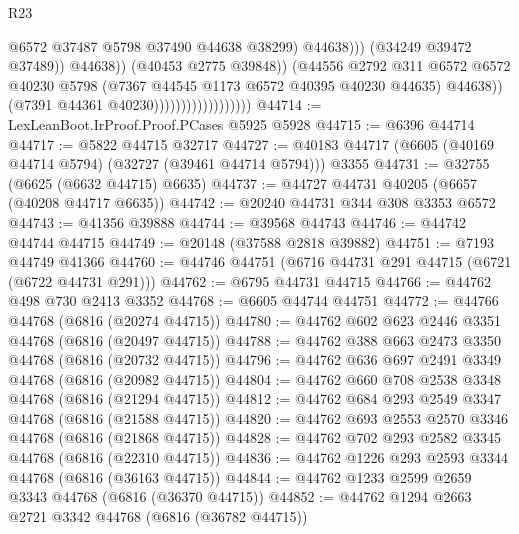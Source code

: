 \begin{lexlean}{R23}
\begin{coremodule}
                                                        @6572
                                                        @37487
                                                        @5798
                                                        @37490
                                                        @44638
                                                        @38299)
                                                      @44638)))
                                                (@34249 @39472 @37489))
                                              @44638))
                                          (@40453 @2775 @39848))
                                        (@44556
                                          @2792
                                          @311
                                          @6572
                                          @6572
                                          @40230
                                          @5798
                                          (@7367 @44545 @1173 @6572 @40395 @40230 @44635)
                                          @44638))
                                      (@7391 @44361 @40230))))))))))))))))))
@44714 := LexLeanBoot.IrProof.Proof.PCases @5925 @5928
@44715 := @6396 @44714
@44717 := @5822 @44715 @32717
@44727 := @40183 @44717 (@6605 (@40169 @44714 @5794) (@32727 (@39461 @44714 @5794))) @3355
@44731 := @32755 (@6625 (@6632 @44715) @6635)
@44737 := @44727 @44731 @40205 (@6657 (@40208 @44717 @6635))
@44742 := @20240 @44731 @344 @308 @3353 @6572
@44743 := @41356 @39888
@44744 := @39568 @44743
@44746 := @44742 @44744 @44715
@44749 := @20148 (@37588 @2818 @39882)
@44751 := @7193 @44749 @41366
@44760 := @44746 @44751 (@6716 @44731 @291 @44715 (@6721 (@6722 @44731 @291)))
@44762 := @6795 @44731 @44715
@44766 := @44762 @498 @730 @2413 @3352
@44768 := @6605 @44744 @44751
@44772 := @44766 @44768 (@6816 (@20274 @44715))
@44780 := @44762 @602 @623 @2446 @3351 @44768 (@6816 (@20497 @44715))
@44788 := @44762 @388 @663 @2473 @3350 @44768 (@6816 (@20732 @44715))
@44796 := @44762 @636 @697 @2491 @3349 @44768 (@6816 (@20982 @44715))
@44804 := @44762 @660 @708 @2538 @3348 @44768 (@6816 (@21294 @44715))
@44812 := @44762 @684 @293 @2549 @3347 @44768 (@6816 (@21588 @44715))
@44820 := @44762 @693 @2553 @2570 @3346 @44768 (@6816 (@21868 @44715))
@44828 := @44762 @702 @293 @2582 @3345 @44768 (@6816 (@22310 @44715))
@44836 := @44762 @1226 @293 @2593 @3344 @44768 (@6816 (@36163 @44715))
@44844 := @44762 @1233 @2599 @2659 @3343 @44768 (@6816 (@36370 @44715))
@44852 := @44762 @1294 @2663 @2721 @3342 @44768 (@6816 (@36782 @44715))

\end{coremodule}
\end{lexlean}
